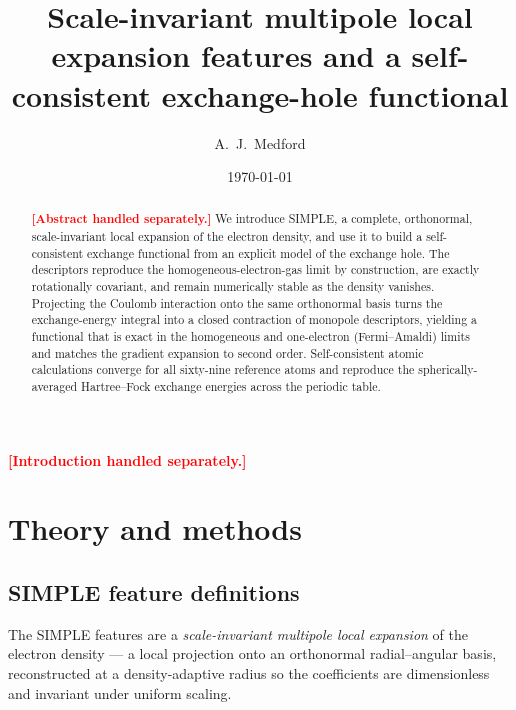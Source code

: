 \documentclass[aps,prb,reprint,superscriptaddress,nofootinbib]{revtex4-2}
\newcommand{\PH}[1]{\textcolor{red}{\textbf{[#1]}}}
\begin{document}
\title{Scale-invariant multipole local expansion features and a self-consistent
exchange-hole functional}

\author{A.~J.~Medford}

\date{\today}

\begin{abstract}
\PH{Abstract handled separately.} We introduce SIMPLE, a complete, orthonormal,
scale-invariant local expansion of the electron density, and use it to build a
self-consistent exchange functional from an explicit model of the exchange hole.
The descriptors reproduce the homogeneous-electron-gas limit by construction,
are exactly rotationally covariant, and remain numerically stable as the density
vanishes. Projecting the Coulomb interaction onto the same orthonormal basis
turns the exchange-energy integral into a closed contraction of monopole
descriptors, yielding a functional that is exact in the homogeneous and
one-electron (Fermi--Amaldi) limits and matches the gradient expansion to second
order. Self-consistent atomic calculations converge for all sixty-nine reference atoms
and reproduce the spherically-averaged Hartree--Fock exchange energies across the
periodic table.
\end{abstract}

\maketitle

\PH{Introduction handled separately.}

\section{Theory and methods}

\subsection{SIMPLE feature definitions}

The SIMPLE features are a \emph{scale-invariant multipole local expansion} of the
electron density --- a local projection onto an orthonormal radial--angular basis,
reconstructed at a density-adaptive radius so the coefficients are dimensionless and
invariant under uniform scaling.
\end{document}
